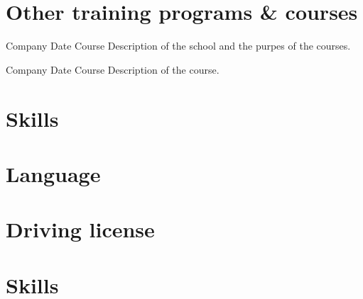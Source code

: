 \documentclass{sobCV}[2015/09/08]
\begin{document}


   \section{Other training programs \& courses}
   \coursenode
      {Company}
      {Date}
      {Course}{%
         Description of the school and the purpes of the courses.
      }

   \coursenode
      {Company}
      {Date}
      {Course}{%
         Description of the course.
      }

   \section{Skills}

   \section{Language}

   \section{Driving license}

   \section{Skills}
\end{document}
